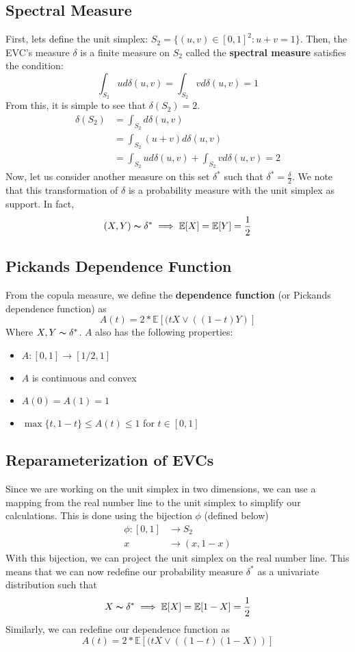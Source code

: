 \documentclass[12pt]{article}
\def\E{\mathbb{E}}
\newcommand{\ds}{\displaystyle}
\theoremstyle{definition}
\theoremstyle{definition}
\begin{document}
\subsection{Spectral Measure}
First, lets define the unit simplex: $S_2=\{(u,v)\in [0,1]^2:u+v=1 \}$. Then, the EVC's measure $\delta$ is a finite measure on $S_2$ called the \textbf{spectral measure} satisfies the condition:
$$\int_{S_2}ud\delta(u,v)=\int_{S_2}vd\delta(u,v)=1$$
From this, it is simple to see that $\delta(S_2)=2$.
\begin{align*}
    \delta(S_2)&=\int_{S_2}d\delta(u,v)\\
    &=\int_{S_2}(u+v)d\delta(u,v)\\
    &=\int_{S_2}ud\delta(u,v)+\int_{S_2}vd\delta(u,v)=2
\end{align*}Now, let us consider another measure on this set $\delta^*$ such that $\ds\delta^*=\frac{\delta}{2}$. We note that this transformation of $\delta$ is a probability measure with the unit simplex as support. In fact, 
$$(X,Y)\thicksim \delta^* \implies \E[X]=\E[Y]=\frac{1}{2}$$

\subsection{Pickands Dependence Function}
From the copula measure, we define the \textbf{dependence function} (or Pickands dependence function) as 
$$A(t)=2*\E[(tX\vee ((1-t)Y)]$$ 
Where $X,Y\thicksim \delta^*$. $A$ also has the following properties:
\begin{itemize}
    \item $A:[0,1]\rightarrow[1/2,1]$
    \item $A$ is continuous and convex
    \item $A(0)=A(1)=1$
    \item $\max \{t,1-t\}\leq A(t)\leq 1$ for $t\in[0,1]$
\end{itemize}
\subsection{Reparameterization of EVCs}
Since we are working on the unit simplex in two dimensions, we can use a mapping from the real number line to the unit simplex to simplify our calculations. This is done using the bijection $\phi$ (defined below)
\begin{align*}
    \ds \phi: [0,1] &\rightarrow S_2\\
    x&\rightarrow(x,1-x)
\end{align*}
With this bijection, we can project the unit simplex on the real number line. This means that we can now redefine our probability measure $\delta^*$ as a univariate distribution such that 
$$X\thicksim \delta^* \implies \E[X]=\E[1-X]=\frac{1}{2}$$
Similarly, we can redefine our dependence function as 
$$A(t)=2* \E[(tX\vee ((1-t)(1-X))]$$
\end{document}
